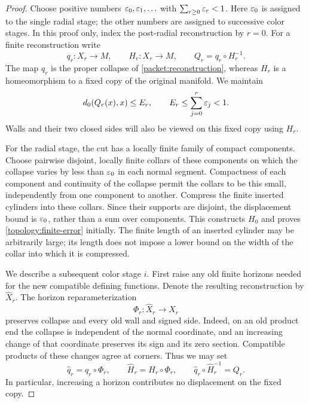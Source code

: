 \begin{proof}
Choose positive numbers $\varepsilon_0,\varepsilon_1,\ldots$ with
$\sum_{r\ge0}\varepsilon_r<1$.  Here $\varepsilon_0$ is assigned to the single radial
stage; the other numbers are assigned to successive color stages.
In this proof only, index the post-radial reconstruction by $r=0$.
For a finite reconstruction write
\[
 q_r:X_r\longrightarrow M,\qquad
 H_r:X_r\longrightarrow M,\qquad
 Q_r=q_r\circ H_r^{-1}.
\]
The map $q_r$ is the proper collapse of
\cref{packet:reconstruction}, whereas $H_r$ is a homeomorphism to a
fixed copy of the original manifold.  We maintain
\begin{equation}\label{topology:finite-error}
 d_0(Q_r(x),x)\le E_r,
 \qquad E_r\le\sum_{j=0}^{r}\varepsilon_j<1.
\end{equation}
Walls and their two closed sides will also be viewed on this fixed copy
using $H_r$.

For the radial stage, the cut has a locally finite family of compact
components.  Choose pairwise disjoint, locally finite collars of these
components on which the collapse varies by less than $\varepsilon_0$ in each
normal segment.  Compactness of each component and continuity of the
collapse permit the collars to be this small, independently from one
component to another.  Compress the finite inserted cylinders into
these collars.  Since their supports are disjoint, the displacement
bound is $\varepsilon_0$, rather than a sum over components.  This constructs
$H_0$ and proves \eqref{topology:finite-error} initially.  The finite
length of an inserted cylinder may be arbitrarily large; its length
does not impose a lower bound on the width of the collar into which it
is compressed.

We describe a subsequent color stage $i$.  First raise any old finite
horizons needed for the new compatible defining functions.  Denote the
resulting reconstruction by $\widehat X_r$.  The horizon
reparameterization
\[
 \Phi_r:\widehat X_r\longrightarrow X_r
\]
preserves collapse and every old wall and signed side.  Indeed, on an
old product end the collapse is independent of the normal coordinate,
and an increasing change of that coordinate preserves its sign and its
zero section.  Compatible products of these changes agree at corners.
Thus we may set
\begin{equation}\label{topology:horizon}
 \widehat q_r=q_r\circ \Phi_r,\qquad
 \widehat H_r=H_r\circ \Phi_r,
 \qquad
 \widehat q_r\circ\widehat H_r^{-1}=Q_r.
\end{equation}
In particular, increasing a horizon contributes no displacement on the
fixed copy.


\end{proof}
